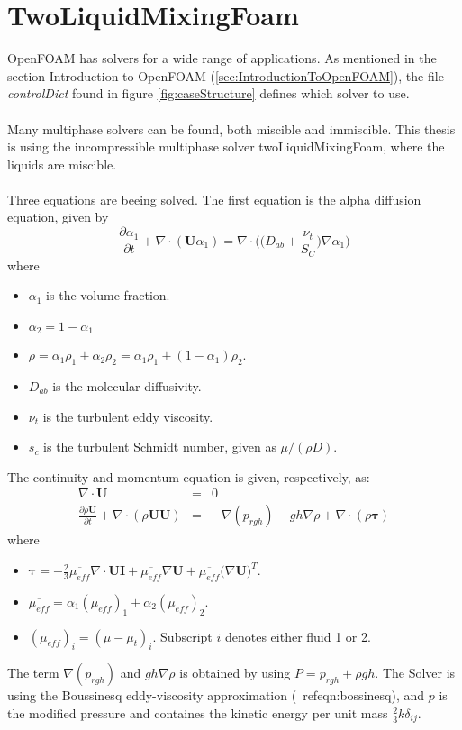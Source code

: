 \documentclass[a4paper, 12pt]{report}
\begin{document}
\section{TwoLiquidMixingFoam}
\label{sec:TwoLiquidMixingFoam}
OpenFOAM has solvers for a wide range of applications. As mentioned in the section Introduction to OpenFOAM (\ref{sec:IntroductionToOpenFOAM}), the file \textit{controlDict} found in figure \ref{fig:caseStructure} defines which solver to use.\\
\\
Many multiphase solvers can be found, both miscible and immiscible. This thesis is using the incompressible multiphase solver twoLiquidMixingFoam, where the liquids are miscible.\\
\\
Three equations are beeing solved. The first equation is the alpha diffusion equation, given by \cite{Krpan}
\begin{equation}
\frac{\partial \alpha_1}{\partial t} + \nabla \cdot (\mathbf{U} \alpha_1) = \nabla \cdot \Big(\big(D_{ab} + \frac{\nu_t}{S_C}  \big)\nabla \alpha_1 \Big) 
\label{eqn:alphaEqTLMF}
\end{equation}
where
\begin{itemize}
	\item $\alpha_1$ is the volume fraction.
	\item $\alpha_2 = 1 - \alpha_1$	
	\item $\rho = \alpha_1 \rho_1 + \alpha_2 \rho_2 = \alpha_1\rho_1 + (1 - \alpha_1)\rho_2$.
	\item $D_{ab}$ is the molecular diffusivity.
	\item $\nu_t$ is the turbulent eddy viscosity.
	\item $s_c$ is the turbulent Schmidt number, given as $\mu / (\rho D)$.
\end{itemize}
The continuity and momentum equation is given, respectively, as: 
\begin{eqnarray}
\label{eqn:continuityTLMF}
\nabla \cdot \mathbf{U} &=& 0 \\
\label{eqn:momentumTLMF}
\frac{\partial \rho \mathbf{U}}{\partial t} + \nabla \cdot(\rho \mathbf{U} \mathbf{U}) &=& - \nabla (p_{rgh}) - gh\nabla \rho + \nabla \cdot (\rho \boldsymbol{\tau})
\end{eqnarray}
where 
\begin{itemize}
	\item $\boldsymbol{\tau} = -\frac{2}{3}\overline{\mu_{eff}}\nabla \cdot \mathbf{U} \mathbf{I} + \overline{\mu_{eff}}\nabla \mathbf{U} + \overline{\mu_{eff}}\big(\nabla \mathbf{U}\big)^T$.
	\item $\overline{\mu_{eff}} = \alpha_1 (\mu_{eff})_1 + \alpha_2 (\mu_{eff})_2$.
	\item $(\mu_{eff})_i = (\mu - \mu_t)_i$. Subscript $i$ denotes either fluid 1 or 2.
\end{itemize}
The term $\nabla(p_{rgh})$ and $gh \nabla \rho$ is obtained by using $P = p_{rgh} + \rho gh$. The Solver is using the Boussinesq eddy-viscosity approximation (\
ref{eqn:bossinesq}), and $p$ is the modified pressure and containes the kinetic energy per unit mass $\frac{2}{3}k\delta_{ij}$.
\end{document}
